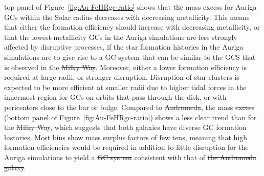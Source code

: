 \documentclass[a4paper,fleqn,usenatbib]{mnras}
\providecommand{\DIFadd}[1]{{\protect\color{blue}\uwave{#1}}} %
\providecommand{\DIFdel}[1]{{\protect\color{red}\sout{#1}}}                      %
\providecommand{\DIFaddbegin}{} %
\providecommand{\DIFaddend}{} %
\providecommand{\DIFdelbegin}{} %
\providecommand{\DIFdelend}{} %
\newcommand{\DIFscaledelfig}{0.5}
\newlength{\DIFdelgraphicswidth} %
\newlength{\DIFdelgraphicsheight} %
\newcommand{\DIFaddincludegraphics}[2][]{{\color{blue}\fbox{\DIFOincludegraphics[#1]{#2}}}} %
\newcommand{\DIFdelincludegraphics}[2][]{%
\sbox{\DIFdelgraphicsbox}{\DIFOincludegraphics[#1]{#2}}%
\settoboxwidth{\DIFdelgraphicswidth}{\DIFdelgraphicsbox} %
\settoboxtotalheight{\DIFdelgraphicsheight}{\DIFdelgraphicsbox} %
\scalebox{\DIFscaledelfig}{%
\parbox[b]{\DIFdelgraphicswidth}{\usebox{\DIFdelgraphicsbox}\\[-\baselineskip] \rule{\DIFdelgraphicswidth}{0em}}\llap{\resizebox{\DIFdelgraphicswidth}{\DIFdelgraphicsheight}{%
\setlength{\unitlength}{\DIFdelgraphicswidth}%
\begin{picture}(1,1)%
\thicklines\linethickness{2pt} %
{\color[rgb]{1,0,0}\put(0,0){\framebox(1,1){}}}%
{\color[rgb]{1,0,0}\put(0,0){\line( 1,1){1}}}%
{\color[rgb]{1,0,0}\put(0,1){\line(1,-1){1}}}%
\end{picture}%
}\hspace*{3pt}}} %
} %
\DeclareRobustCommand{\DIFaddbegin}{\DIFOaddbegin \let\includegraphics\DIFaddincludegraphics} %
\DeclareRobustCommand{\DIFaddend}{\DIFOaddend \let\includegraphics\DIFOincludegraphics} %
\DeclareRobustCommand{\DIFdelbegin}{\DIFOdelbegin \let\includegraphics\DIFdelincludegraphics} %
\DeclareRobustCommand{\DIFdelend}{\DIFOaddend \let\includegraphics\DIFOincludegraphics} %
\begin{document}
\DIFadd{The }\DIFaddend top panel of Figure~\ref{fig:Au-FeHRgc-ratio} shows that \DIFdelbegin \DIFdel{the }\DIFdelend mass excess for
Auriga GCs within the Solar radius decreases with decreasing metallicity. This
means that either the formation efficiency should increase with decreasing metallicity,
or that the lowest-metallicity GCs in the Auriga simulations are less strongly affected
by disruptive processes, if the star formation histories in the Auriga simulations
are to give rise to a \DIFdelbegin \DIFdel{GC system }\DIFdelend \DIFaddbegin \DIFadd{GCS }\DIFaddend that can be similar to the GCS that is observed
in the \DIFdelbegin \DIFdel{Milky Way}\DIFdelend \DIFaddbegin \DIFadd{MW}\DIFaddend . Moreover, either a lower formation efficiency is required at
large radii, or stronger disruption. Disruption of star clusters is expected to
be more efficient at smaller radii due to higher tidal forces in the innermost
region for GCs on orbits that pass through the disk, or with pericenters close 
to the bar or bulge. Compared to \DIFdelbegin \DIFdel{Andromeda}\DIFdelend \DIFaddbegin \DIFadd{M31}\DIFaddend , the mass \DIFdelbegin \DIFdel{excess }\DIFdelend \DIFaddbegin \DIFadd{ratio }\DIFaddend (bottom panel of 
Figure~\ref{fig:Au-FeHRgc-ratio}) shows a less clear trend than for the \DIFdelbegin \DIFdel{Milky Way}\DIFdelend \DIFaddbegin \DIFadd{MW}\DIFaddend ,
which suggests that both galaxies have diverse GC formation histories.
Most bins show mass surplus factors of few tens, meaning that high formation 
efficiencies would be required in addition to little disruption for the Auriga 
simulations to yield a \DIFdelbegin \DIFdel{GC system }\DIFdelend \DIFaddbegin \DIFadd{GCS }\DIFaddend consistent with that of \DIFdelbegin \DIFdel{the Andromeda galaxy}\DIFdelend \DIFaddbegin \DIFadd{M31}\DIFaddend .
\end{document}
